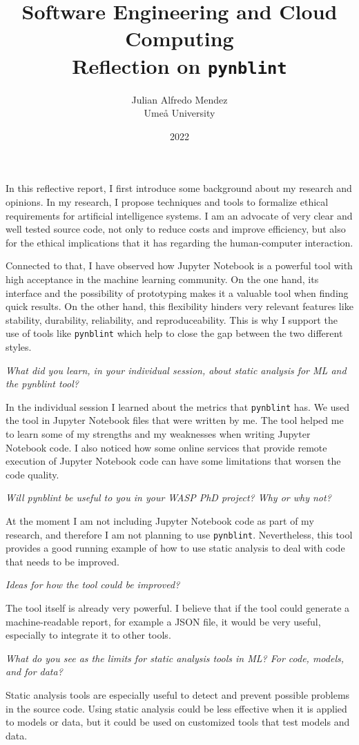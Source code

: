 \documentclass[11pt]{article}
\begin{document}
    \title{Software Engineering and Cloud Computing \\
    Reflection on \texttt{pynblint}
    }
    \author{Julian Alfredo Mendez \\
    Ume{\aa} University}

    \date{2022}

    \maketitle


    In this reflective report, I first introduce some background about my research and opinions.
    In my research, I propose techniques and tools to formalize ethical requirements for artificial intelligence systems.
    I am an advocate of very clear and well tested source code, not only to reduce costs and improve efficiency, but also for the ethical implications that it has regarding the human-computer interaction.

    Connected to that, I have observed how Jupyter Notebook is a powerful tool with high acceptance in the machine learning community.
    On the one hand, its interface and the possibility of prototyping makes it a valuable tool when finding quick results.
    On the other hand, this flexibility hinders very relevant features like stability, durability, reliability, and reproduceability.
    This is why I support the use of tools like \texttt{pynblint} which help to close the gap between the two different styles.

    \textit{What did you learn, in your individual session, about static analysis for ML and the pynblint tool?}

    In the individual session I learned about the metrics that \texttt{pynblint} has.
    We used the tool in Jupyter Notebook files that were written by me.
    The tool helped me to learn some of my strengths and my weaknesses when writing Jupyter Notebook code.
    I also noticed how some online services that provide remote execution of Jupyter Notebook code can have some limitations that worsen the code quality.

    \textit{Will pynblint be useful to you in your WASP PhD project? Why or why not?}

    At the moment I am not including Jupyter Notebook code as part of my research, and therefore I am not planning to use \texttt{pynblint}.
    Nevertheless, this tool provides a good running example of how to use static analysis to deal with code that needs to be improved.

    \textit{Ideas for how the tool could be improved?}

    The tool itself is already very powerful.
    I believe that if the tool could generate a machine-readable report, for example a JSON file, it would be very useful, especially to integrate it to other tools.

    \textit{What do you see as the limits for static analysis tools in ML? For code, models, and for data?}

    Static analysis tools are especially useful to detect and prevent possible problems in the source code.
    Using static analysis could be less effective when it is applied to models or data, but it could be used on customized tools that test models and data.
\end{document}
